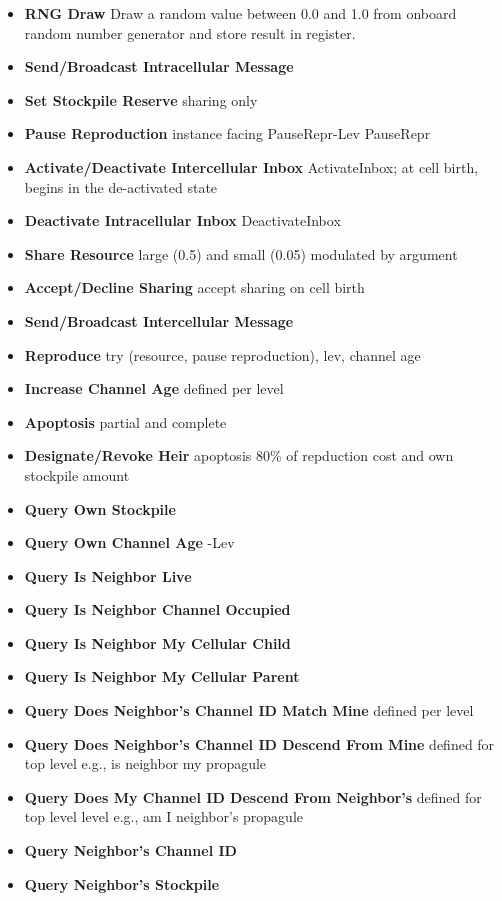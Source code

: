 \begin{itemize}
\item \textbf{RNG Draw} Draw a random value between 0.0 and 1.0 from onboard random number generator and store result in register.
\item \textbf{Send/Broadcast Intracellular Message}
\item \textbf{Set Stockpile Reserve} sharing only
\item \textbf{Pause Reproduction} instance facing PauseRepr-Lev PauseRepr
\item \textbf{Activate/Deactivate Intercellular Inbox} ActivateInbox; at cell birth, begins in the de-activated state
\item \textbf{Deactivate Intracellular Inbox}  DeactivateInbox
\item \textbf{Share Resource} large (0.5) and small (0.05) modulated by argument
\item \textbf{Accept/Decline Sharing} accept sharing on cell birth
\item \textbf{Send/Broadcast Intercellular Message}
\item \textbf{Reproduce} try (resource, pause reproduction), lev, channel age
\item \textbf{Increase Channel Age} defined per level
\item \textbf{Apoptosis} partial and complete
\item \textbf{Designate/Revoke Heir} apoptosis 80\% of repduction cost and own stockpile amount
\item \textbf{Query Own Stockpile}
\item \textbf{Query Own Channel Age} -Lev
\item \textbf{Query Is Neighbor Live}
\item \textbf{Query Is Neighbor Channel Occupied}
\item \textbf{Query Is Neighbor My Cellular Child}
\item \textbf{Query Is Neighbor My Cellular Parent}
\item \textbf{Query Does Neighbor's Channel ID Match Mine} defined per level
\item \textbf{Query Does Neighbor's Channel ID Descend From Mine} defined for top level e.g., is neighbor my propagule
\item \textbf{Query Does My Channel ID Descend From Neighbor's} defined for top level level e.g., am I neighbor's propagule
\item \textbf{Query Neighbor's Channel ID}
\item \textbf{Query Neighbor's Stockpile}
\end{itemize}


